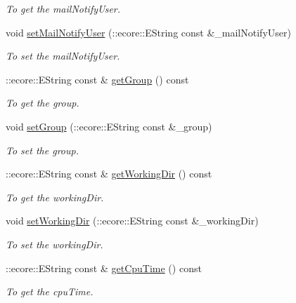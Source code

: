 \begin{DoxyCompactItemize}
\begin{DoxyCompactList}\small\item\em To get the mailNotifyUser. \item\end{DoxyCompactList}\item 
void \hyperlink{classTMS__Data_1_1SubmitOptions_ac7345449b13b57414a427f9136811866}{setMailNotifyUser} (::ecore::EString const \&\_\-mailNotifyUser)
\begin{DoxyCompactList}\small\item\em To set the mailNotifyUser. \item\end{DoxyCompactList}\item 
::ecore::EString const \& \hyperlink{classTMS__Data_1_1SubmitOptions_a378f802f923f3cc58a48c8a5da888d57}{getGroup} () const 
\begin{DoxyCompactList}\small\item\em To get the group. \item\end{DoxyCompactList}\item 
void \hyperlink{classTMS__Data_1_1SubmitOptions_ace63731e3ed33f86b73f250450faed8c}{setGroup} (::ecore::EString const \&\_\-group)
\begin{DoxyCompactList}\small\item\em To set the group. \item\end{DoxyCompactList}\item 
::ecore::EString const \& \hyperlink{classTMS__Data_1_1SubmitOptions_a12beb8f6ef0765cb66bb158051b11ecc}{getWorkingDir} () const 
\begin{DoxyCompactList}\small\item\em To get the workingDir. \item\end{DoxyCompactList}\item 
void \hyperlink{classTMS__Data_1_1SubmitOptions_ab6f746aa84c30a0b3286c1bcdc6641ca}{setWorkingDir} (::ecore::EString const \&\_\-workingDir)
\begin{DoxyCompactList}\small\item\em To set the workingDir. \item\end{DoxyCompactList}\item 
::ecore::EString const \& \hyperlink{classTMS__Data_1_1SubmitOptions_a6428df53f8293297254fc1a262443c6c}{getCpuTime} () const 
\begin{DoxyCompactList}\small\item\em To get the cpuTime. \item\end{DoxyCompactList}\item 

\end{DoxyCompactItemize}
